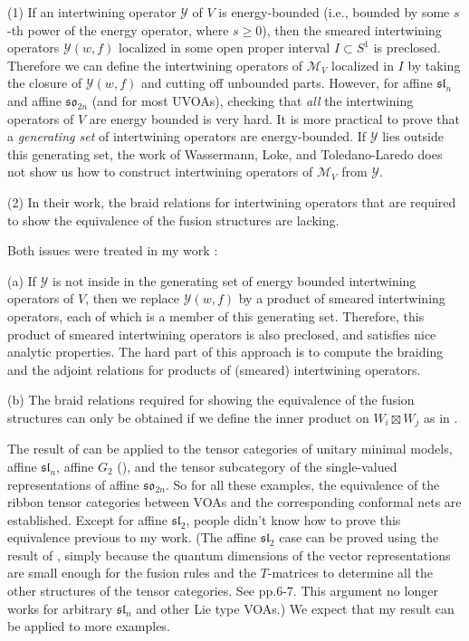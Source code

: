 \documentclass[10pt]{amsart}
\theoremstyle{definition}
\theoremstyle{plain}
\begin{document}
(1) If an intertwining operator $\mathcal Y$ of $V$ is energy-bounded (i.e., bounded by some $s$-th power of the energy operator, where $s\geq0$), then  the smeared intertwining operators $\mathcal Y(w,f)$ localized in some open proper interval $I\subset S^1$ is preclosed. Therefore we can define the intertwining operators of $\mathcal M_V$ localized in $I$ by taking the closure of $\mathcal Y(w,f)$ and cutting off  unbounded parts. However, for affine $\mathfrak {sl}_n$ and affine $\mathfrak {so}_{2n}$ (and  for most UVOAs), checking that \emph{all} the intertwining operators of $V$ are energy bounded is very hard. It is more practical to prove that a \emph{generating set} of intertwining operators are energy-bounded. If $\mathcal Y$ lies outside this generating set, the work of Wassermann, Loke, and Toledano-Laredo does not show us how to construct intertwining operators of $\mathcal M_V$ from $\mathcal Y$. 

(2) In their work, the braid relations for intertwining operators that are required to show the equivalence of the fusion structures are lacking.

Both issues were treated in my work \cite{G equivalence}:

(a) If $\mathcal Y$ is not inside in the generating set of energy bounded intertwining operators of $V$, then we replace $\mathcal Y(w,f)$ by a product of smeared intertwining operators, each of which is a member of this generating set. Therefore, this product of smeared intertwining operators is also preclosed, and satisfies nice analytic properties.   The hard part of this approach is to compute the braiding and the adjoint relations for products of (smeared) intertwining operators.  

(b) The  braid relations required for showing the equivalence of the fusion structures can only be obtained if we define the inner product on $W_i\boxtimes W_j$  as in  \cite{G unitary1,G unitary2}. 

The result of \cite{G equivalence} can be applied to the tensor categories of unitary minimal models, affine $\mathfrak {sl}_{n}$, affine $G_2$ (\cite{G G2}), and the tensor subcategory of the single-valued representations of affine $\mathfrak {so}_{2n}$. So for all these examples, the equivalence of the ribbon tensor categories between VOAs and the corresponding conformal nets are established. Except for affine $\mathfrak{sl}_{2}$, people didn't know how to prove this equivalence previous to my work. (The affine $\mathfrak {sl}_2$ case can be proved using the result of \cite{Wass}, simply because the quantum dimensions of the vector representations are small enough for the fusion rules and the $T$-matrices to determine all the other structures of the tensor categories. See \cite{Hen15} pp.6-7. This argument no longer works for arbitrary $\mathfrak {sl}_n$ and other Lie type VOAs.) We expect that my result can be applied  to more examples.
\end{document}
